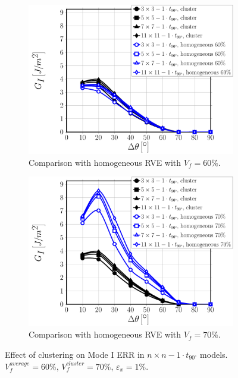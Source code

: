 \documentclass[review]{elsarticle}
\begin{document}
\begin{figure}[!h]
\centering
    \begin{subfigure}[b]{0.475\textwidth}
        \includegraphics[width=\textwidth]{nxn-1t90-vf60-GI.pdf}
        \caption{Comparison with homogeneous RVE with $V_{f}=60\%$.}\label{subfig:cluster1t90nxnModeI60}
    \end{subfigure}\quad
    \begin{subfigure}[b]{0.475\textwidth}
        \includegraphics[width=\textwidth]{nxn-1t90-vf70-GI.pdf}
        \caption{Comparison with homogeneous RVE with $V_{f}=70\%$.}\label{subfig:cluster1t90nxnModeI70}
    \end{subfigure}

\caption{Effect of clustering on Mode I ERR in $n\times n-1\cdot t_{90^{\circ}}$ models. $V^{average}_{f}=60\%$, $V^{cluster}_{f}=70\%$, $\varepsilon_{x}=1\%$.}\label{fig:cluster1t90nxnModeI}
\end{figure}
\end{document}
